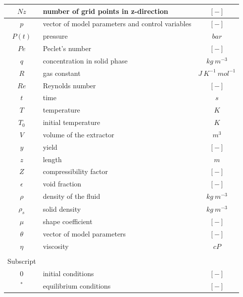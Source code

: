 \documentclass[a4paper,fleqn]{cas-dc}
\begin{document}
\begin{table}[p]
\begin{tabular}{ |c|l|c| }
			$Nz$		&	number of grid points in z-direction	& $[-]$						\\ \hline
			$p$			&	vector of model parameters and control variables	& $[-]$			\\ \hline
			$P(t)$		&	pressure								& $bar$						\\ \hline
			$Pe$		&	Peclet's number							& $[-]$						\\ \hline
			$q$			&	concentration in solid phase			& $kg ~ m^{-3}$				\\ \hline
			$R$			&	gas constant							& $J ~ K^{-1} ~ mol^{-1}$	\\ \hline
			$Re$		&	Reynolds number							& $[-]$						\\ \hline
			$t$			&	time									& $s$						\\ \hline
			$T$			&	temperature								& $K$						\\ \hline
			$T_0$		&	initial temperature						& $K$						\\ \hline
			$V$			&	volume of the extractor					& $m^3$						\\ \hline
			$y$			&	yield	 								& $[-]$						\\ \hline
			$z$			&	length									& $m$						\\ \hline
			$Z$			&	compressibility	factor					& $[-]$						\\ \hline
			$\epsilon$	&	void fraction							& $[-]$						\\ \hline
			$\rho$		&	density of the fluid					& $kg ~ m^{-3}$				\\ \hline
			$\rho_s$	&	solid density							& $kg ~ m^{-3}$				\\ \hline
			$\mu$		&	shape coefficient						& $[-]$						\\ \hline
			$\theta$	&	vector of model parameters				& $[-]$						\\ \hline
			$\eta$		&	viscosity								& $cP$						\\ \hline				
						& 											&							\\ \hline			
		 	Subscript	& 											&							\\ \hline
			$0$			&	initial conditions						& $[-]$						\\ \hline
			$^*$		&	equilibrium conditions					& $[-]$						\\ \hline							
		\end{tabular}
\end{table}
\end{document}
